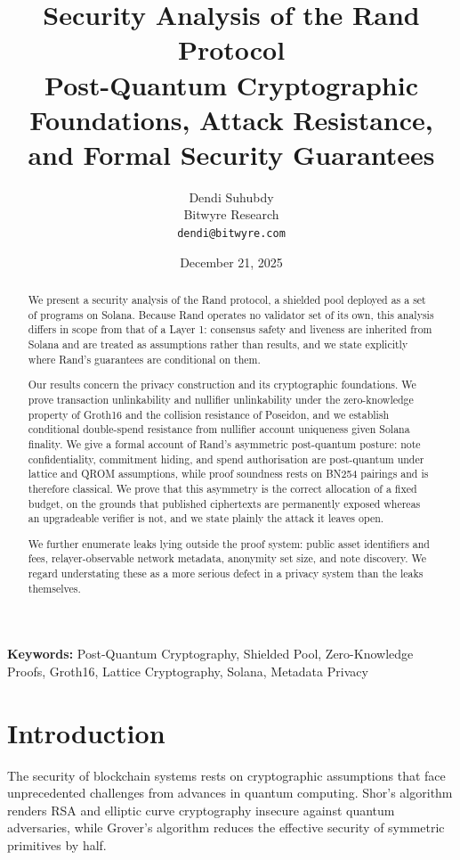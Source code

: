 \documentclass[11pt,a4paper]{article}
\title{\textbf{Security Analysis of the Rand Protocol}\\[0.5em]
\large Post-Quantum Cryptographic Foundations, Attack Resistance,\\and Formal Security Guarantees}
\author{Dendi Suhubdy\\
Bitwyre Research\\
\texttt{dendi@bitwyre.com}}
\date{December 21, 2025}
\begin{document}
\maketitle

\begin{abstract}
We present a security analysis of the Rand protocol, a shielded pool deployed as a set of programs on Solana. Because Rand operates no validator set of its own, this analysis differs in scope from that of a Layer 1: consensus safety and liveness are inherited from Solana and are treated as assumptions rather than results, and we state explicitly where Rand's guarantees are conditional on them.

Our results concern the privacy construction and its cryptographic foundations. We prove transaction unlinkability and nullifier unlinkability under the zero-knowledge property of Groth16 and the collision resistance of Poseidon, and we establish conditional double-spend resistance from nullifier account uniqueness given Solana finality. We give a formal account of Rand's asymmetric post-quantum posture: note confidentiality, commitment hiding, and spend authorisation are post-quantum under lattice and QROM assumptions, while proof soundness rests on BN254 pairings and is therefore classical. We prove that this asymmetry is the correct allocation of a fixed budget, on the grounds that published ciphertexts are permanently exposed whereas an upgradeable verifier is not, and we state plainly the attack it leaves open.

We further enumerate leaks lying outside the proof system: public asset identifiers and fees, relayer-observable network metadata, anonymity set size, and note discovery. We regard understating these as a more serious defect in a privacy system than the leaks themselves.
\end{abstract}

\noindent\textbf{Keywords:} Post-Quantum Cryptography, Shielded Pool, Zero-Knowledge Proofs, Groth16, Lattice Cryptography, Solana, Metadata Privacy

\tableofcontents
\newpage

\section{Introduction}

The security of blockchain systems rests on cryptographic assumptions that face unprecedented challenges from advances in quantum computing. Shor's algorithm renders RSA and elliptic curve cryptography insecure against quantum adversaries, while Grover's algorithm reduces the effective security of symmetric primitives by half.
\end{document}
